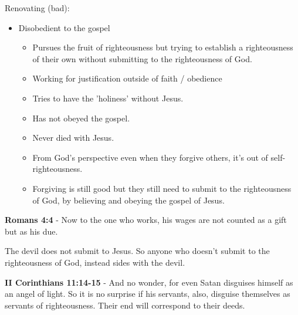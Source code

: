 \documentclass[11pt]{article}
\begin{document}
Renovating (bad):
\begin{itemize}
\item Disobedient to the gospel
\begin{itemize}
\item Pursues the fruit of righteousness but trying to establish a righteousness of their own without submitting to the righteousness of God.
\item Working for justification outside of faith / obedience
\item Tries to have the 'holiness' without Jesus.
\item Has not obeyed the gospel.
\item Never died with Jesus.
\item From God's perspective even when they forgive others, it's out of self-righteousness.
\item Forgiving is still good but they still need to submit to the righteousness of God, by believing and obeying the gospel of Jesus.
\end{itemize}
\end{itemize}

\textbf{Romans 4:4} - Now to the one who works, his wages are not counted as a gift but as his due.

The devil does not submit to Jesus. So anyone who doesn't submit to the righteousness of God, instead sides with the devil.

\textbf{II Corinthians 11:14-15} - And no wonder, for even Satan disguises himself as an angel of light. So it is no surprise if his servants, also, disguise themselves as servants of righteousness. Their end will correspond to their deeds.
\end{document}
